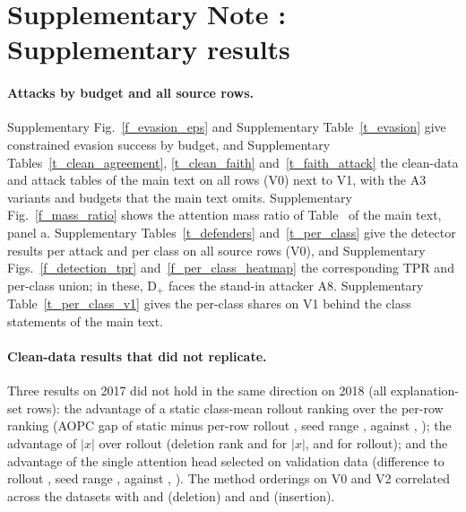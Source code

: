 \section*{Supplementary Note \suppNoteResults: Supplementary results}
\label{sec:si_results}
\paragraph{Attacks by budget and all source rows.}
Supplementary Fig.~\ref{f_evasion_eps} and Supplementary Table~\ref{t_evasion} give constrained evasion success by
budget, and Supplementary Tables~\ref{t_clean_agreement}, \ref{t_clean_faith} and~\ref{t_faith_attack} the clean-data
and attack tables of the main text on all rows (V0) next to V1, with the A3 variants and budgets that the main text
omits.
Supplementary Fig.~\ref{f_mass_ratio} shows the attention mass ratio of Table~\mainTabAttn{} of the main text, panel a.
Supplementary Tables~\ref{t_defenders} and~\ref{t_per_class} give the detector results per attack and per class on all
source rows (V0), and Supplementary Figs.~\ref{f_detection_tpr} and~\ref{f_per_class_heatmap} the corresponding TPR and
per-class union; in these, D$_+$ faces the stand-in attacker A8.
Supplementary Table~\ref{t_per_class_v1} gives the per-class shares on V1 behind the class statements of the main text.

\paragraph{Clean-data results that did not replicate.}
Three results on 2017 did not hold in the same direction on 2018 (all explanation-set rows): the advantage of a static
class-mean rollout ranking over the per-row ranking (AOPC gap of static minus per-row rollout \staticGapSeventeen{},
seed range \staticGapSeventeenRange, against \staticGapEighteen, \staticGapEighteenRange); the advantage of $|x|$ over
rollout (deletion rank \rankDelAbsXSeventeen{} and \rankDelAbsXEighteen{} for $|x|$, \rankDelRolloutSeventeen{} and
\rankDelRolloutEighteen{} for rollout); and the advantage of the single attention head selected on validation data
(difference to rollout \headMinusRolloutSeventeen, seed range \headMinusRolloutSeventeenRange, against
\headMinusRolloutEighteen, \headMinusRolloutEighteenRange).
The method orderings on V0 and V2 correlated across the datasets with \ordSpDelVzero{} and \ordSpDelVtwo{} (deletion)
and \ordSpInsVzero{} and \ordSpInsVtwo{} (insertion).

